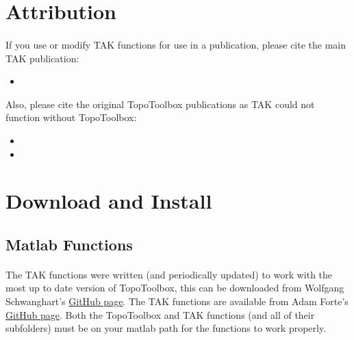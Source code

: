 

\section{Attribution} \label{sec:attrb}
\paragraph{}If you use or modify TAK functions for use in a publication, please cite the main TAK publication:

\begin{itemize}
	\item {}
\end{itemize}

Also, please cite the original TopoToolbox publications as TAK could not function without TopoToolbox:

\begin{itemize}
	\item {} 
	\item {}
\end{itemize}

\section{Download and Install} \label{sec:dwnld}

\subsection{Matlab Functions}

\paragraph{}The TAK functions were written (and periodically updated) to work with the most up to date version of TopoToolbox, this can be downloaded from Wolfgang Schwanghart's \href{https://github.com/wschwanghart/topotoolbox}{GitHub page}. The TAK functions are available from Adam Forte's \href{https://github.com/amforte/Topographic-Analysis-Kit}{GitHub page}. Both the TopoToolbox and TAK functions (and all of their subfolders) must be on your matlab path for the functions to work properly.

